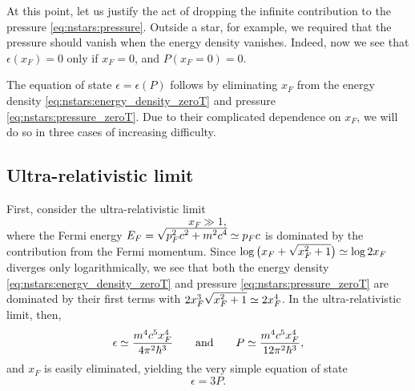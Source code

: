 At this point, let us justify the act of dropping the infinite contribution to the pressure \eqref{eq:nstars:pressure}.
Outside a star, for example, we required that the pressure should vanish when the energy density vanishes.
Indeed, now we see that $\epsilon(x_F) = 0$ only if $x_F = 0$, and $P(x_F=0) = 0$.

The equation of state $\epsilon = \epsilon(P)$ follows by eliminating $x_F$ from the energy density \eqref{eq:nstars:energy_density_zeroT} and pressure \eqref{eq:nstars:pressure_zeroT}.
Due to their complicated dependence on $x_F$, we will do so in three cases of increasing difficulty.

\subsection{Ultra-relativistic limit}
\label{sec:nstars:ur_limit}

First, consider the ultra-relativistic limit
\begin{equation}
	x_F \gg 1 , 
\label{eq:nstars:ur_limit}
\end{equation}
where the Fermi energy $E_F = \sqrt{\smash[b]{p_F^2 c^2 + m^2 c^4}} \simeq p_F c$ is dominated by the contribution from the Fermi momentum.
Since $\log \big( x_F + \sqrt{\smash[b]{x_F^2 + 1}} \big) \simeq \log 2 x_F$ diverges only logarithmically, we see that both the energy density \eqref{eq:nstars:energy_density_zeroT} and pressure \eqref{eq:nstars:pressure_zeroT} are dominated by their first terms with $2 x_F^3 \sqrt{\smash[b]{x_F^2 + 1}} \simeq 2 x_F^4$.
In the ultra-relativistic limit, then,
\begin{equation}
	\epsilon \simeq \frac{m^4 c^5 x_F^4}{4 \pi^2 \hbar^3}
	\qquad \text{and} \qquad
	P        \simeq \frac{m^4 c^5 x_F^4}{12 \pi^2 \hbar^3},
\end{equation}
and $x_F$ is easily eliminated, yielding the very simple equation of state
\begin{equation}
	\epsilon = 3 P .
\label{eq:nstars:ur_eos}
\end{equation}

